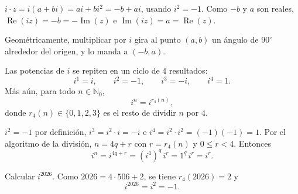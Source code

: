 \begin{demostracion}
$i\cdot z=i(a+bi)=ai+bi^2=-b+ai$, usando $i^2=-1$. Como $-b$ y $a$ son reales,
$\operatorname{Re}(iz)=-b=-\operatorname{Im}(z)$ e $\operatorname{Im}(iz)=a=\operatorname{Re}(z)$.
\end{demostracion}
\begin{nota}{}
Geométricamente, multiplicar por $i$ gira al punto $(a,b)$ un ángulo de
$90^\circ$ alrededor del origen, y lo manda a $(-b,a)$.
\end{nota}
\begin{proposicion}[{title={Potencias de $i$}}]
Las potencias de $i$ se repiten en un ciclo de $4$ resultados:
\[
i^1=i,\qquad i^2=-1,\qquad i^3=-i,\qquad i^4=1.
\]
Más aún, para todo $n\in\mathbb{N}_0$,
\[
i^n=i^{r_4(n)},
\]
donde $r_4(n)\in\{0,1,2,3\}$ es el resto de dividir $n$ por $4$.
\end{proposicion}
\begin{demostracion}
$i^2=-1$ por definición, $i^3=i^2\cdot i=-i$ e $i^4=i^2\cdot i^2=(-1)(-1)=1$.
Por el algoritmo de la división, $n=4q+r$ con $r=r_4(n)$ y $0\le r<4$. Entonces
\[
i^n=i^{4q+r}=(i^4)^q\, i^r=1^q\, i^r=i^r.
\]
\end{demostracion}
\begin{ejemplo}
Calcular $i^{2026}$. Como $2026=4\cdot 506+2$, se tiene $r_4(2026)=2$ y
\[
i^{2026}=i^2=-1.
\]
\end{ejemplo}
